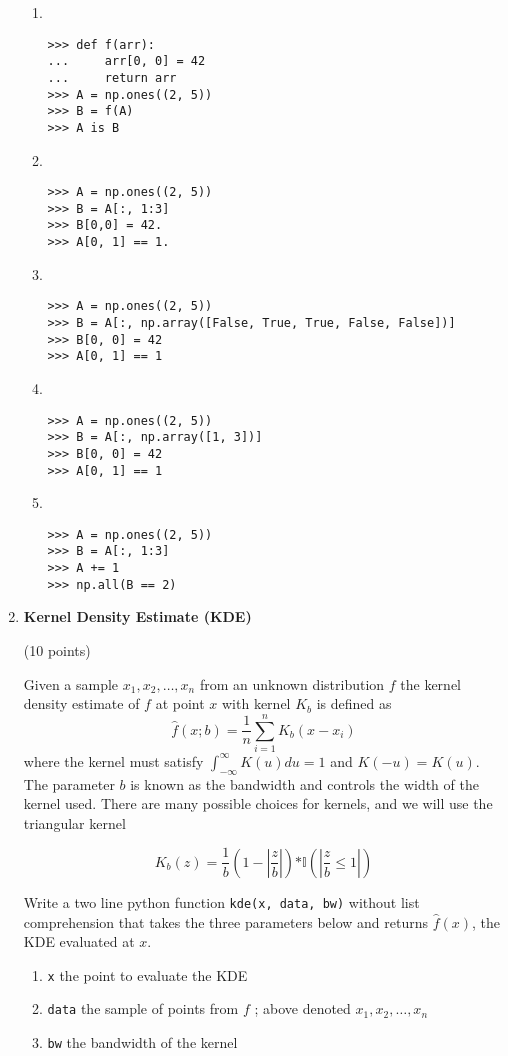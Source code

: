 \documentclass{article}
\newcounter{points}
\newcommand\setpoints[1]{\addtocounter{points}{#1}(#1 points)}
\begin{document}
\begin{enumerate}
\begin{enumerate}
\item  \\
\begin{verbatim}
>>> def f(arr):
...     arr[0, 0] = 42
...     return arr
>>> A = np.ones((2, 5))
>>> B = f(A)
>>> A is B
\end{verbatim}

\item  \\
\begin{verbatim}
>>> A = np.ones((2, 5))
>>> B = A[:, 1:3]
>>> B[0,0] = 42.
>>> A[0, 1] == 1.
\end{verbatim}

\item  \\
\begin{verbatim}
>>> A = np.ones((2, 5))
>>> B = A[:, np.array([False, True, True, False, False])]
>>> B[0, 0] = 42
>>> A[0, 1] == 1
\end{verbatim}


\item  \\
\begin{verbatim}
>>> A = np.ones((2, 5))
>>> B = A[:, np.array([1, 3])]
>>> B[0, 0] = 42
>>> A[0, 1] == 1
\end{verbatim}

\item  \\
\begin{verbatim}
>>> A = np.ones((2, 5))
>>> B = A[:, 1:3]
>>> A += 1
>>> np.all(B == 2)
\end{verbatim}
\end{enumerate}


\newpage
\item \textbf{Kernel Density Estimate (KDE)} \setpoints{10}

Given a sample $x_1, x_2, \dots, x_n$ from an unknown distribution $f$ the kernel density estimate of $f$ at point $x$ with kernel $K_b$ is defined as 
$$\hat{f}(x;b) = \frac{1}{n}\sum_{i=1}^{n}K_b(x-x_i)$$
where the kernel must satisfy $\int_{-\infty}^{\infty}K(u)du = 1$ and $K(-u) = K(u).$ The parameter $b$ is known as the bandwidth and controls the width of the kernel used. There are many possible choices for kernels, and we will use the triangular kernel

$$K_{b}(z) = \frac{1}{b}(1 - |\frac{z}{b}|)\mathbb{*I}(|\frac{z}{b} \leq 1|)$$ 

Write a two line python function \texttt{kde(x, data, bw)} without list comprehension that takes the three parameters below and returns $\hat{f}(x)$, the KDE evaluated at $x$.
\begin{enumerate}
\item \texttt{x} the point to evaluate the KDE
\item \texttt{data}  the sample of points from $f$  ; above denoted $x_1, x_2, \dots, x_n$ 
\item \texttt{bw} the bandwidth of the kernel
\end{enumerate}


\end{enumerate}
\end{document}
